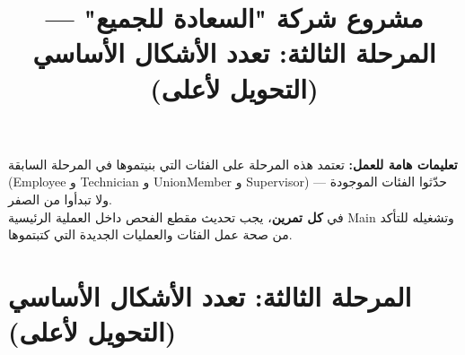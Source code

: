 \documentclass[14pt]{extarticle}
\title{مشروع شركة "السعادة للجميع" — المرحلة الثالثة: تعدد الأشكال الأساسي (التحويل لأعلى)}
\begin{document}
\maketitle
\thispagestyle{fancy}

\begin{boxWarning}
\textbf{تعليمات هامة للعمل:}
تعتمد هذه المرحلة على الفئات التي بنيتموها في المرحلة السابقة (\textenglish{Employee} و \textenglish{Technician} و \textenglish{UnionMember} و \textenglish{Supervisor}) — حدّثوا الفئات الموجودة ولا تبدأوا من الصفر. \\
في \textbf{كل تمرين}، يجب تحديث مقطع الفحص داخل العملية الرئيسية \textenglish{Main} وتشغيله للتأكد من صحة عمل الفئات والعمليات الجديدة التي كتبتموها.
\end{boxWarning}

\section*{المرحلة الثالثة: تعدد الأشكال الأساسي (التحويل لأعلى)}
\end{document}

